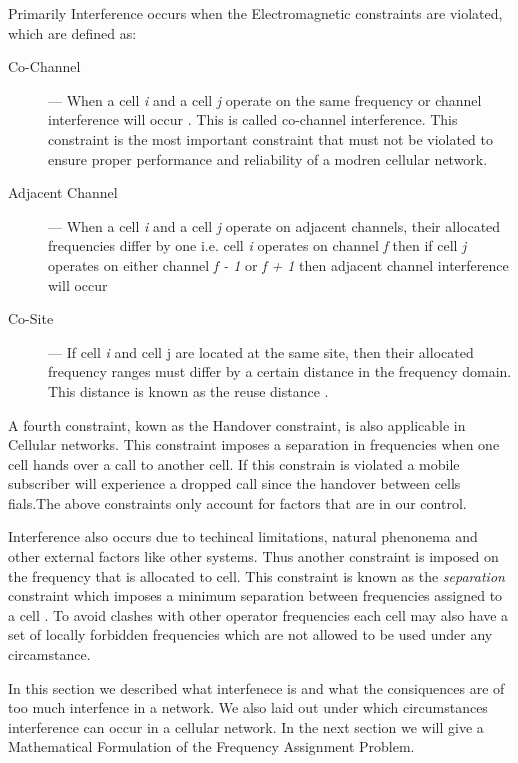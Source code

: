 Primarily Interference occurs when the Electromagnetic constraints are violated, which are defined as:
\begin{description}
\item[Co-Channel] --- When a cell \emph{i} and a cell \emph{j} operate on the same frequency or channel interference will occur \cite{Eisenblatter,EfficientEvoChannelManagement,Karen2004,ACOvsEA,InterferenceOrientatedFAP}. This is called co-channel interference. This constraint is the most important constraint that must not be violated to ensure proper performance and reliability of a modren cellular network\cite{EfficientEvoChannelManagement}.
\item[Adjacent Channel] --- When a cell \emph{i} and a cell \emph{j} operate on adjacent channels, their allocated frequencies differ by one i.e. cell \emph{i} operates on channel \emph{f} then if cell \emph{j} operates on either channel \emph{f - 1} or \emph{f + 1} then adjacent channel interference will occur \cite{Eisenblatter,EfficientEvoChannelManagement,Karen2004,ACOvsEA,InterferenceOrientatedFAP}
\item[Co-Site] --- If cell \emph{i} and cell {j} are located at the same site, then their allocated frequency ranges must differ by a certain distance in the frequency domain. This distance is known as the reuse distance \cite{FixedFAPPSO,EgyptFAPPSO}.
\end{description}
A fourth constraint, kown as the Handover constraint, is also applicable in Cellular networks. This constraint imposes a separation in frequencies when one cell hands over a call to another cell. If this constrain is violated a mobile subscriber will experience a dropped call since the handover between cells fials.The above constraints only account for factors that are in our control.

Interference also occurs due to techincal limitations, natural phenonema and other external factors like other systems. Thus another constraint is imposed on the frequency that is allocated to cell. This constraint is known as the \emph{separation} constraint which imposes a minimum separation between frequencies assigned to a cell \cite{Eisenblatter,InterferenceOrientatedFAP}. To avoid clashes with other operator frequencies each cell may also have a set of locally forbidden frequencies which are not allowed to be used under any circamstance.

In this section we described what interfenece is and what the consiquences are of too much interfence in a network. We also laid out under which circumstances interference can occur in a cellular network. In the next section we will give a Mathematical Formulation of the Frequency Assignment Problem.
